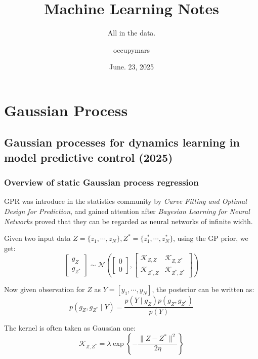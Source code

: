 \documentclass[10pt]{elegantbook}
\title{Machine Learning Notes}
\subtitle{All in the data.}
\author{occupymars}
\date{June. 23, 2025}
\begin{document}
\maketitle

\frontmatter
\tableofcontents

\mainmatter

\chapter{Gaussian Process}

\section{Gaussian processes for dynamics learning in model predictive control (2025)}

\subsection{Overview of static Gaussian process regression}

GPR was introduce in the statistics community by \textit{Curve Fitting and Optimal Design for Prediction}, and gained
attention after \textit{Bayesian Learning for Neural Networks} proved that they can be regarded as neural networks of infinite
width.

Given two input data $Z = \{ z_1, \cdots, z_N \}, Z^* = \{ z^*_1, \cdots, z^*_N \}$, using the GP prior, we get:
\[
\begin{bmatrix}
    g_Z \\ g_{Z^*}
\end{bmatrix} \sim \mathcal N 
\left (
\begin{bmatrix}
    0 \\ 0
\end{bmatrix},
\begin{bmatrix}
    \mathscr{K}_{Z, Z} & \mathscr{K}_{Z, Z^*} \\
    \mathscr{K}_{Z^*, Z} & \mathscr{K}_{Z^*, Z^*}
\end{bmatrix}    
\right )
\]

Now given observation for $Z$ as $Y = [y_1, \cdots, y_N]$, the posterior can be written as:
\[
p(g_Z, g_{Z^*} \mid Y) = \frac{p(Y \mid g_Z)p(g_Z, g_{Z^*})}{p(Y)}
\]

The kernel is often taken as Gaussian one:
\[
\mathscr{K}_{Z, Z^*} = \lambda \exp \left \{ -\frac{\| Z - Z^* \|^2}{2 \eta} \right \}
\]
\end{document}
